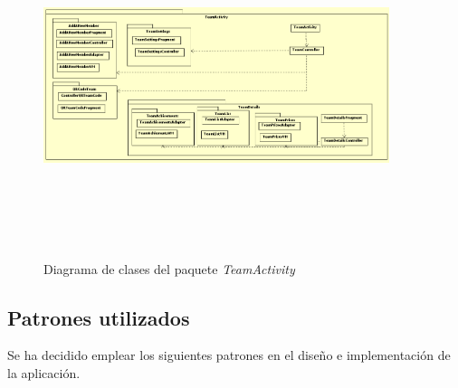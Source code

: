 \documentclass[twoside]{report}
\begin{document}
\begin{figure}[H]
\centering
\includegraphics[height=10cm,width=0.9\textwidth]{images/structureTeam.PNG}
\caption{Diagrama de clases del paquete \textit{TeamActivity}}
\end{figure}

\subsection{Patrones utilizados}
Se ha decidido emplear los siguientes patrones en el diseño e implementación de la aplicación.
\end{document}
